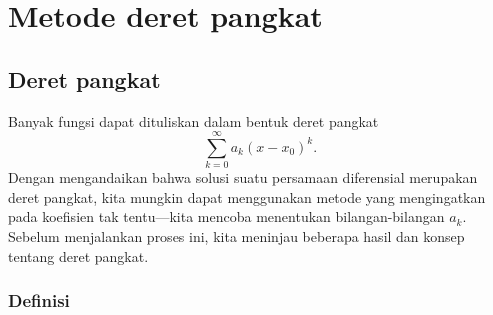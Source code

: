 \chapter{Metode deret pangkat} \label{ps:chapter}


\section{Deret pangkat}
\label{powerseries:section}



Banyak fungsi dapat dituliskan dalam bentuk deret pangkat
\begin{equation*}
\sum_{k=0}^\infty a_k {(x-x_0)}^k .
\end{equation*}
Dengan mengandaikan bahwa solusi suatu persamaan diferensial merupakan
deret pangkat, kita mungkin dapat menggunakan metode yang mengingatkan pada koefisien
tak tentu---kita mencoba menentukan bilangan-bilangan $a_k$.
Sebelum menjalankan proses ini, kita meninjau beberapa hasil
dan konsep tentang deret pangkat.

\subsection{Definisi}

